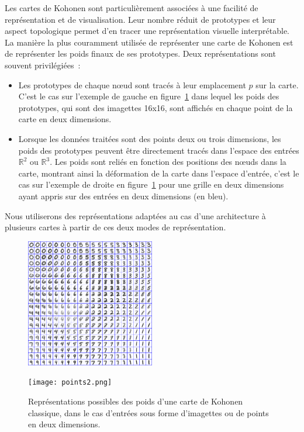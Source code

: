 \documentclass[../main]{subfiles}
\begin{document}
Les cartes de Kohonen sont particulièrement associées à une facilité de représentation et de visualisation. Leur nombre réduit de prototypes et leur aspect topologique permet d'en tracer une représentation visuelle interprétable.
La manière la plus couramment utilisée de représenter une carte de Kohonen est de représenter les poids finaux de ses prototypes. 
Deux représentations sont souvent privilégiées~:
\begin{itemize}
\item Les prototypes de chaque n\oe{}ud sont tracés à leur emplacement $p$ sur la carte. 
C'est le cas sur l'exemple de gauche en figure~\ref{fig:representation} dans lequel les poids des prototypes, qui sont des imagettes 16x16, sont affichés en chaque point de la carte en deux dimensions.
\item Lorsque les données traitées sont des points deux ou trois dimensions, les poids des prototypes peuvent être directement tracés dans l'espace des entrées $\mathbb{R}^2$ ou $\mathbb{R}^3$. Les poids sont reliés en fonction des positions des n\oe{}uds dans la carte, montrant ainsi la déformation de la carte dans l'espace d'entrée, c'est le cas sur l'exemple de droite en figure~\ref{fig:representation} pour une grille en deux dimensions ayant appris sur des entrées en deux dimensions (en bleu).
\end{itemize}

Nous utiliserons des représentations adaptées au cas d'une architecture à plusieurs cartes à partir de ces deux modes de représentation.

\begin{figure}
\begin{minipage}{0.5\textwidth}
\centering
\includegraphics[width=0.5\textwidth]{digits.jpg}
\end{minipage}
\begin{minipage}{0.5\textwidth}
\centering
\texttt{[image: points2.png]}
\end{minipage}
\caption[Représentations classiques des poids d'une carte de Kohonen]{\label{fig:representation} Représentations possibles des poids d'une carte de Kohonen classique, dans le cas d'entrées sous forme d'imagettes ou de points en deux dimensions.\footnotemark}
\end{figure}
\end{document}
